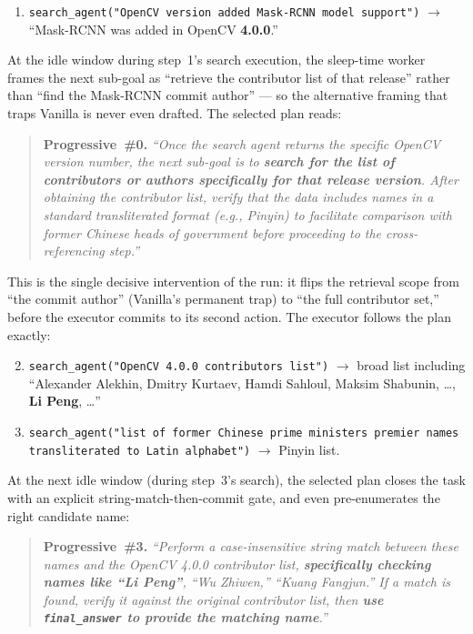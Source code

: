 \begin{tcolorbox}[colback=blue!4, colframe=blue!60!black, title={\textsc{\methodname{}} (Pred: Li Peng / GT: Li Peng; 5 steps)}, fontupper=\small, breakable]
\begin{enumerate}
  \item \texttt{search\_agent("OpenCV version added Mask-RCNN model support")} $\rightarrow$ ``Mask-RCNN was added in OpenCV \textbf{4.0.0}.''
\end{enumerate}
At the idle window during step~1's search execution, the sleep-time worker frames the next sub-goal as ``retrieve the contributor list of that release'' rather than ``find the Mask-RCNN commit author'' --- so the alternative framing that traps Vanilla is never even drafted. The selected plan reads:
\begin{quote}\small
\textbf{Progressive~\#0.} \textit{``Once the search agent returns the specific OpenCV version number, the next sub-goal is to \textbf{search for the list of contributors or authors specifically for that release version}. After obtaining the contributor list, verify that the data includes names in a standard transliterated format (e.g., Pinyin) to facilitate comparison with former Chinese heads of government before proceeding to the cross-referencing step.''}
\end{quote}
This is the single decisive intervention of the run: it flips the retrieval scope from ``the commit author'' (Vanilla's permanent trap) to ``the full contributor set,'' before the executor commits to its second action. The executor follows the plan exactly:
\begin{enumerate}
\setcounter{enumi}{1}
  \item \texttt{search\_agent("OpenCV 4.0.0 contributors list")} $\rightarrow$ broad list including ``Alexander Alekhin, Dmitry Kurtaev, Hamdi Sahloul, Maksim Shabunin, \dots, \textbf{Li Peng}, \dots''
\end{enumerate}
\begin{enumerate}
\setcounter{enumi}{2}
  \item \texttt{search\_agent("list of former Chinese prime ministers premier names transliterated to Latin alphabet")} $\rightarrow$ Pinyin list.
\end{enumerate}
At the next idle window (during step~3's search), the selected plan closes the task with an explicit string-match-then-commit gate, and even pre-enumerates the right candidate name:
\begin{quote}\small
\textbf{Progressive~\#3.} \textit{``Perform a case-insensitive string match between these names and the OpenCV 4.0.0 contributor list, \textbf{specifically checking names like ``Li Peng''}, ``Wu Zhiwen,'' ``Kuang Fangjun.'' If a match is found, verify it against the original contributor list, then \textbf{use \texttt{final\_answer} to provide the matching name}.''}

\end{quote}
\end{tcolorbox}
